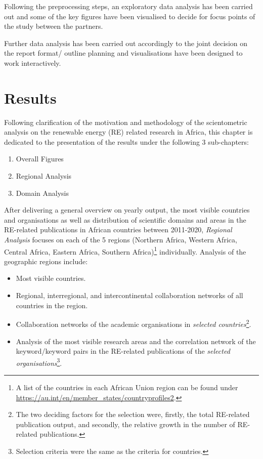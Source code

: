 \documentclass[12pt,twoside]{report}
\providecommand{\tightlist}{%
  \setlength{\itemsep}{0pt}\setlength{\parskip}{0pt}}
\let\rmarkdownfootnote\footnote%
\def\footnote{\protect\rmarkdownfootnote}
\begin{document}
Following the preprocessing steps, an exploratory data analysis has been carried out and some of the key figures have been visualised to decide for focus points of the study between the partners.

Further data analysis has been carried out accordingly to the joint decision on the report format/ outline planning and visualisations have been designed to work interactively.

\hypertarget{results}{%
\chapter{Results}\label{results}}

Following clarification of the motivation and methodology of the
scientometric analysis on the renewable energy (RE) related research in Africa,
this chapter is dedicated to the presentation of the results under the following
3 sub-chapters:

\begin{enumerate}
\def\labelenumi{\arabic{enumi}.}
\tightlist
\item
  Overall Figures
\item
  Regional Analysis
\item
  Domain Analysis
\end{enumerate}

After delivering a general overview on yearly output, the most visible
countries and organisations as well as distribution of scientific domains and
areas in the RE-related publications in African countries between 2011-2020, \emph{Regional
Analysis} focuses on each of the 5 regions (Northern Africa, Western Africa, Central Africa,
Eastern Africa, Southern Africa)\footnote{A list of the countries in each African Union region can
  be found under \url{https://au.int/en/member_states/countryprofiles2}.} individually. Analysis of the geographic regions
include:

\begin{itemize}
\tightlist
\item
  Most visible countries.
\item
  Regional, interregional, and intercontinental collaboration networks of all countries in the region.
\item
  Collaboration networks of the academic organisations in \emph{selected countries}\footnote{The two deciding factors for the selection were, firstly, the total RE-related
    publication output, and secondly, the relative growth in the number of RE-related publications.}.
\item
  Analysis of the most visible research areas and the correlation network of the
  keyword/keyword pairs in the RE-related publications of the \emph{selected organisations}\footnote{Selection criteria were the same as the criteria for countries.}.
\end{itemize}
\end{document}
